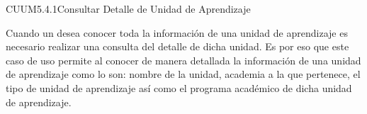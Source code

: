 \begin{UseCase}{CUUM5.4.1}{Consultar Detalle de Unidad de Aprendizaje}
	{
		Cuando un  desea conocer toda la información de una unidad de aprendizaje es necesario realizar una consulta del detalle de dicha unidad. Es por eso que este caso de uso permite al  conocer de manera detallada  la información de una unidad de aprendizaje como lo son: nombre de la unidad, academia a la que pertenece, el tipo de unidad de aprendizaje así como el programa académico de dicha unidad de aprendizaje. 
			
		}
		
		
		

\end{UseCase}
